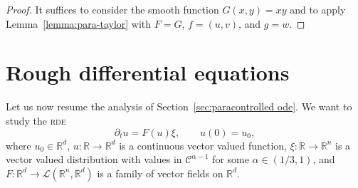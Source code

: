 \documentclass[11pt,a4paper]{article}
\theoremstyle{remark}
\newcommand{\R}{\mathbb{R}}
\newcommand{\Lcal}{\mathcal{L}}
\newcommand{\CC}{\ensuremath{\mathscr{C}}}
\begin{document}
\begin{proof}
  It suffices to consider the smooth function $G( x,y ) =x y$ and to apply
  Lemma~\ref{lemma:para-taylor} with $F=G$, $f= ( u,v )$, and $g=w$.
\end{proof}



\section{Rough differential equations}\label{sec:ODE}

Let us now resume the analysis of Section~\ref{sec:paracontrolled ode}. We want to study the \textsc{rde}
\begin{equation}\label{eq:rde} 
  \partial_{t} u=F ( u ) \xi, \qquad u(0) = u_0,
\end{equation}
where $u_0 \in \R^d$, $u\colon \mathbb{R} \rightarrow \mathbb{R}^{d}$ is a continuous vector
valued function, $\xi\colon \mathbb{R} \rightarrow \mathbb{R}^{n}$ is a vector valued distribution with values in
$\CC^{\alpha -1}$ for some $\alpha \in ( 1/3,1 )$, and
$F\colon \mathbb{R}^{d} \rightarrow \Lcal ( \mathbb{R}^{n} ,\mathbb{R}^{d})$ is a family of vector fields on $\mathbb{R}^{d}$.
\end{document}
